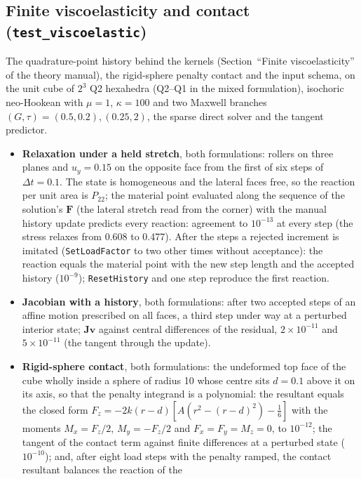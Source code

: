 \documentclass[11pt]{article}
\newcommand{\bF}{\bm{F}}
\DeclareRobustCommand{\code}[1]{{\def\_{\textunderscore\allowbreak}\texttt{#1}}}
\begin{document}
\subsection{Finite viscoelasticity and contact (\texttt{test\_viscoelastic})}
\label{sec:testvisco}
The quadrature-point history behind the kernels (Section~``Finite
viscoelasticity'' of the theory manual), the rigid-sphere penalty contact and
the input schema, on the unit cube of $2^3$ Q2 hexahedra (Q2--Q1 in the
mixed formulation), isochoric neo-Hookean with $\mu = 1$, $\kappa = 100$ and
two Maxwell branches $(G, \tau) = (0.5, 0.2), (0.25, 2)$, the sparse direct
solver and the tangent predictor.
\begin{itemize}[nosep]
  \item \textbf{Relaxation under a held stretch}, both formulations: rollers
    on three planes and $u_y = 0.15$ on the opposite face from the first of
    six steps of $\Delta t = 0.1$.  The state is homogeneous and the
    lateral faces free, so the reaction per unit area is $P_{22}$; the
    material point evaluated along the sequence of the solution's $\bF$
    (the lateral stretch read from the corner) with the manual history
    update predicts every reaction: agreement to $10^{-13}$ at every step
    (the stress relaxes from 0.608 to 0.477).  After the steps a rejected
    increment is imitated (\code{SetLoadFactor} to two other times without
    acceptance): the reaction equals the material point with the new step
    length and the accepted history ($10^{-9}$); \code{ResetHistory} and
    one step reproduce the first reaction.
  \item \textbf{Jacobian with a history}, both formulations: after two
    accepted steps of an affine motion prescribed on all faces, a third step
    under way at a perturbed interior state; $\bm J\bm v$ against central
    differences of the residual, $2\times10^{-11}$ and $5\times10^{-11}$
    (the tangent through the update).
  \item \textbf{Rigid-sphere contact}, both formulations: the undeformed top
    face of the cube wholly inside a sphere of radius 10 whose centre sits
    $d = 0.1$ above it on its axis, so that the penalty integrand is a
    polynomial: the resultant equals the closed form
    $F_z = -2k(r - d)[A(r^2 - (r - d)^2) - \tfrac16]$ with the moments
    $M_x = F_z/2$, $M_y = -F_z/2$ and $F_x = F_y = M_z = 0$, to $10^{-12}$;
    the tangent of the contact term against finite differences at a
    perturbed state ($10^{-10}$); and, after eight load steps with the
    penalty ramped, the contact resultant balances the reaction of the

\end{itemize}
\end{document}
